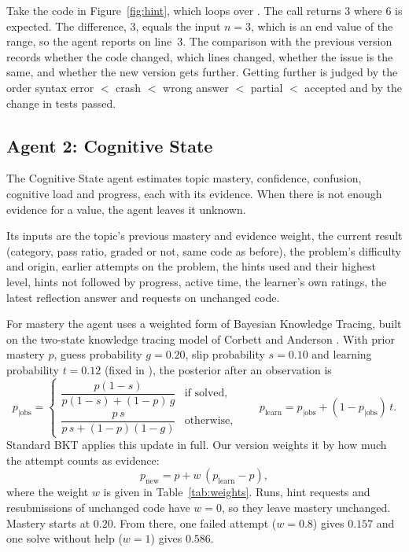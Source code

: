 Take the code in Figure~\ref{fig:hint}, which loops over . The call  returns 3 where 6 is expected. The difference, 3, equals the input $n=3$, which is an end value of the range, so the agent reports  on line~3. The comparison with the previous version records whether the code changed, which lines changed, whether the issue is the same, and whether the new version gets further. Getting further is judged by the order syntax error $<$ crash $<$ wrong answer $<$ partial $<$ accepted and by the change in tests passed.

\subsection{Agent 2: Cognitive State}
The Cognitive State agent estimates topic mastery, confidence, confusion, cognitive load and progress, each with its evidence. When there is not enough evidence for a value, the agent leaves it unknown.

Its inputs are the topic's previous mastery and evidence weight, the current result (category, pass ratio, graded or not, same code as before), the problem's difficulty and origin, earlier attempts on the problem, the hints used and their highest level, hints not followed by progress, active time, the learner's own ratings, the latest reflection answer and requests on unchanged code.

For mastery the agent uses a weighted form of Bayesian Knowledge Tracing, built on the two-state knowledge tracing model of Corbett and Anderson \cite{corbett1995}. With prior mastery $p$, guess probability $g=0.20$, slip probability $s=0.10$ and learning probability $t=0.12$ (fixed in ), the posterior after an observation is
\begin{equation}
p_{\mid\text{obs}}=
\begin{cases}
\dfrac{p(1-s)}{p(1-s)+(1-p)\,g} & \text{if solved,}\\[10pt]
\dfrac{p\,s}{p\,s+(1-p)(1-g)} & \text{otherwise,}
\end{cases}
\qquad
p_{\text{learn}} = p_{\mid\text{obs}} + (1-p_{\mid\text{obs}})\,t .
\end{equation}
Standard BKT applies this update in full. Our version weights it by how much the attempt counts as evidence:
\begin{equation}
p_{\text{new}} = p + w\,(p_{\text{learn}} - p),
\end{equation}
where the weight $w$ is given in Table~\ref{tab:weights}. Runs, hint requests and resubmissions of unchanged code have $w=0$, so they leave mastery unchanged. Mastery starts at $0.20$. From there, one failed attempt ($w=0.8$) gives $0.157$ and one solve without help ($w=1$) gives $0.586$.


